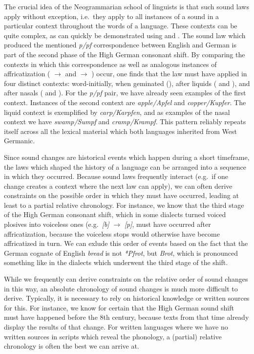 The crucial idea of the Neogrammarian school of linguists is that such sound laws apply without exception, i.e.\ they apply to all instances of a sound in a particular context throughout the words of a language. These contexts can be quite complex, as can quickly be demonstrated using  and . The sound law which produced the mentioned \textit{p/pf} correspondence between English and German is part of the second phase of the High German consonant shift. By comparing the contexts in which this correspondence as well as analogous instances of affricatization (\ipa{[t]} $\rightarrow$ \ipa{[\t{ts}]} and \ipa{[k]} $\rightarrow$ \ipa{[\t{kx}]}) occur, one finds that the law must have applied in four distinct contexts: word-initially, when geminated (\ipa{[p:],[t:],[k:]}), after liquids (\ipa{[l]} and \ipa{[r]}), and after nasals (\ipa{[m]} and \ipa{[n]}). For the \textit{p/pf} pair, we have already seen examples of the first context. Instances of the second context are \textit{apple/Apfel} and \textit{copper/Kupfer}. The liquid context is exemplified by \textit{carp/Karpfen}, and as examples of the nasal context we have \textit{swamp/Sumpf} and \textit{cramp/Krampf}. This pattern reliably repeats itself across all the lexical material which both languages inherited from West Germanic.

Since sound changes are historical events which happen during a short timeframe, the laws which shaped the history of a language can be arranged into a sequence in which they occurred. Because sound laws frequently interact (e.g.\ if one change creates a context where the next law can apply), we can often derive constraints on the possible order in which they must have occurred, leading at least to a partial relative chronology. For instance, we know that the third stage of the High German consonant shift, which in some  dialects turned voiced plosives into voiceless ones (e.g.\ \textit{[b]} $\rightarrow$ \textit{[p]}, must have occurred after affricatization, because the voiceless stops would otherwise have become affricatized in turn. We can exlude this order of events based on the fact that the German cognate of English \textit{bread} is not \textit{*Pfrot}, but \textit{Brot}, which is pronounced something like \ipa{[pRo:t]} in the dialects which underwent the third stage of the shift.

While we frequently can derive constraints on the relative order of sound changes in this way, an absolute chronology of sound changes is much more difficult to derive. Typically, it is necessary to rely on historical knowledge or written sources for this. For instance, we know for certain that the High German sound shift must have happened before the 8th century, because  texts from that time already display the results of that change. For written languages where we have no written sources in scripts which reveal the phonology, a (partial) relative chronology is often the best we can arrive at.

